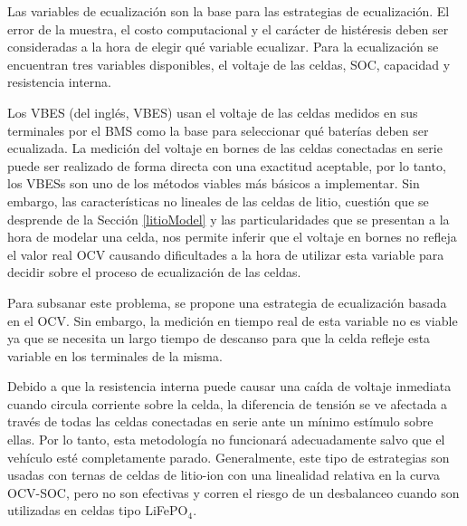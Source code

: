 \documentclass[10pt,a4paper]{article}
\newcounter{subsubsubsection}[subsubsection]
\begin{document}

Las variables de ecualizaci\'on son la base para las estrategias de
ecualizaci\'on. El error de la muestra, el costo computacional y el car\'acter de
hist\'eresis deben ser consideradas a la hora de elegir qué variable ecualizar.
Para la ecualizaci\'on se encuentran tres variables disponibles, el voltaje de 
las celdas, \acrshort{SOC}, capacidad y resistencia interna.


Los \acrshort{VBES} (del ingl\'es, \acrlong{VBES}) usan el voltaje de las celdas
medidos en sus terminales por el \acrshort{BMS} como la base para seleccionar
qué bater\'ias deben ser ecualizada. La medición del voltaje en bornes de las
celdas conectadas en serie puede ser realizado de forma directa con una
exactitud aceptable, por lo tanto, los \acrshort{VBES}s son uno de los m\'etodos
viables m\'as b\'asicos a implementar. Sin embargo, las características no
lineales de las celdas de litio, cuestión que se desprende de la Sección
\ref{litioModel} y las particularidades que se presentan a la hora de modelar
una celda, nos permite inferir que el voltaje en bornes no refleja el valor real
\acrshort{OCV} causando dificultades a la hora de utilizar esta variable para
decidir sobre el proceso de ecualizaci\'on de las celdas.

Para subsanar este problema, se propone una estrategia de ecualizaci\'on basada
en el \acrshort{OCV}. Sin embargo, la medici\'on en tiempo real de esta variable
no es viable ya que se necesita un largo tiempo de descanso para que la celda
refleje esta variable en los terminales de la misma.

Debido a que la resistencia interna puede causar una ca\'ida de voltaje
inmediata cuando circula corriente sobre la celda, la diferencia de tensi\'on se
ve afectada a trav\'es de todas las celdas conectadas en serie ante un m\'inimo
est\'imulo sobre ellas. Por lo tanto, esta metodolog\'ia no funcionar\'a
adecuadamente salvo que el veh\'iculo est\'e completamente parado.
Generalmente, este tipo de estrategias son usadas con ternas de celdas de
litio-ion con una linealidad relativa en la curva \acrshort{OCV}-\acrshort{SOC},
pero no son efectivas y corren el riesgo de un desbalanceo cuando son utilizadas
en celdas tipo LiFeP$\mathrm{O_4}$. 

\end{document}
